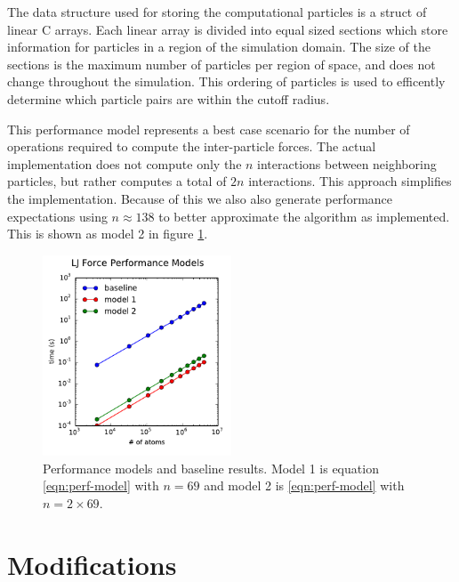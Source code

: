 \documentclass[12pt]{article}
\begin{document}
The data structure used for storing the computational particles is a
struct of linear C arrays. Each linear array is divided into equal
sized sections which store information for particles in a region of
the simulation domain. The size of the sections is the maximum number
of particles per region of space, and does not change throughout the
simulation. This ordering of particles is used to efficently determine
which particle pairs are within the cutoff radius.

This performance model represents a best case scenario for the number
of operations required to compute the inter-particle forces. The
actual implementation does not compute only the $n$ interactions
between neighboring particles, but rather computes a total of $2n$
interactions. This approach simplifies the implementation. Because of
this we also also generate performance expectations using $n\approx
138$ to better approximate the algorithm as implemented. This is shown
as model 2 in figure \ref{fig:perf-models}.



\begin{figure}[h!]
  \centering
  \includegraphics[width=0.5\textwidth]{../figs/perfmodel_forceLJ}
  \caption{Performance models and baseline results. Model 1 is
    equation \ref{eqn:perf-model} with $n=69$ and model 2 is
    \ref{eqn:perf-model} with $n=2\times69$.}
  \label{fig:perf-models}
\end{figure}

\section{Modifications}
\label{sec:mods}
\end{document}
